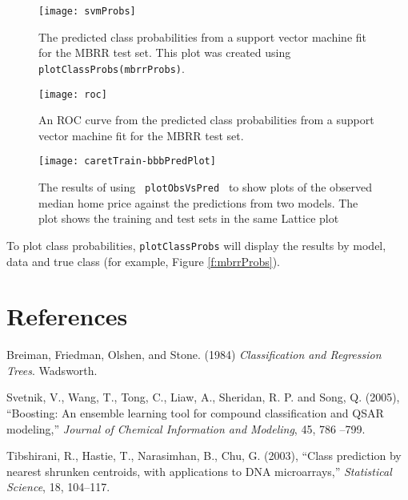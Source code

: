 \documentclass[12pt]{article}
\begin{document}
\begin{figure}[ht]
   \begin{center}      
      \texttt{[image: svmProbs]}   
      \caption{The predicted class probabilities from a support vector machine fit for the MBRR test set. This plot was created using \texttt{plotClassProbs(mbrrProbs)}.}
      \label{f:mbrrProbs}         
      \vspace*{.5 in}      
       \texttt{[image: roc]}   
      \caption{An ROC curve from the predicted class probabilities from a support vector machine fit for the MBRR test set. }
      \label{f:mbrrROC}       
   \end{center}
\end{figure}  

\begin{figure}
   \begin{center}      
\texttt{[image: caretTrain-bbbPredPlot]}
      \caption{The results of using \texttt{ plotObsVsPred } to show plots of the observed median home price against the predictions from two models. The plot shows the training and test sets in the same Lattice plot}
      \label{f:bbbPredPlot}         
   \end{center}
\end{figure}


To plot class probabilities, \texttt{plotClassProbs} will display the results by model, data and true class (for example, Figure \ref{f:mbrrProbs}).     

\section{References}

\begin{description}

   
   \item Breiman, Friedman, Olshen, and Stone. (1984) {\it Classification and Regression Trees}. Wadsworth.


   \item Svetnik, V., Wang, T., Tong, C., Liaw, A., Sheridan, R. P. and Song, Q. (2005), ``Boosting: An ensemble learning tool for compound classification and QSAR modeling,'' {\it Journal of Chemical Information and Modeling}, 45, 786 --799.
   
   \item Tibshirani, R., Hastie, T., Narasimhan, B., Chu, G. (2003), ``Class prediction by nearest shrunken centroids, with applications to DNA microarrays,'' {\it  Statistical Science}, 18, 104--117.


\end{description}
\end{document}
